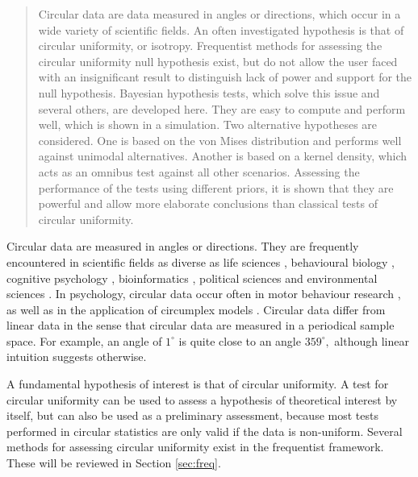 \begin{abstract}
Circular data are data measured in angles or directions, which occur in a wide variety of scientific fields.
An often investigated hypothesis is that of circular uniformity, or isotropy.
Frequentist methods for assessing the circular uniformity null hypothesis exist, but do not allow the user faced with an insignificant result to distinguish lack of power and support for the null hypothesis.
Bayesian hypothesis tests, which solve this issue and several others, are developed here. 
They are easy to compute and perform well, which is shown in a simulation.
Two alternative hypotheses are considered. 
One is based on the von Mises distribution and performs well against unimodal alternatives. Another is based on a kernel density, which acts as an omnibus test against all other scenarios.
Assessing the performance of the tests using different priors, it is shown that they are powerful and allow more elaborate conclusions than classical tests of circular uniformity.
\end{abstract}
\newpage

Circular data are measured in angles or directions. They are frequently encountered in scientific fields as diverse as life sciences \citep{mardianew}, behavioural biology \citep{bulbert2015danger}, cognitive psychology \citep{kaas2006haptic}, bioinformatics \citep{mardia2008multivariate}, political sciences \citep{gill2010} and environmental sciences \citep{arnold2006recent}. In psychology, circular data occur often in motor behaviour research \citep{mechsner2001perceptual, mechsner2007bimanual, postma2008keep, baayen2012test}, as well as in the application of circumplex models \citep{gurtman2003circumplex, gurtman2009exploring, Leary1957}. Circular data differ from linear data in the sense that circular data are measured in a periodical sample space. For example, an angle of $1^{\circ}$ is quite close to an angle $359^{\circ},$ although linear intuition suggests otherwise.

A fundamental hypothesis of interest is that of circular uniformity. A test for circular uniformity can be used to assess a hypothesis of theoretical interest by itself, but can also be used as a preliminary assessment, because most tests performed in circular statistics are only valid if the data is non-uniform. Several methods for assessing circular uniformity exist in the frequentist framework. These will be reviewed in Section \ref{sec:freq}.


